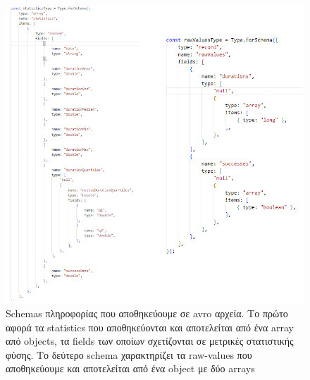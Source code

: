 \begin{figure}[!ht]
	\centering
	\includegraphics[width=1\textwidth]{./images/chapter4/avro_types.png}
	\caption[Schemas πληροφορίας που αποθηκεύουμε σε avro αρχεία]{Schemas πληροφορίας που αποθηκεύουμε σε avro αρχεία. Το πρώτο αφορά τα statistics που αποθηκεύονται και αποτελείται από ένα array από objects, τα fields των οποίων σχετίζονται σε μετρικές στατιστικής φύσης. Το δεύτερο schema χαρακτηρίζει τα raw-values που αποθηκεύουμε και αποτελείται από ένα object με δύο arrays}
	\label{fig:avro_types}
\end{figure}



